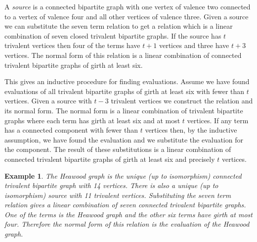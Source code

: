 \documentclass[12pt]{amsart}
\newtheorem{ex}[thm]{Example}
\newcommand{\Dfn}[1]{\emph{\color{blue}#1}}
\begin{document}
A \Dfn{source} is a connected bipartite graph with one vertex of valence two connected to a vertex of valence four and all other vertices of valence three.
Given a source we can substitute the seven term relation to get a relation which is a linear combination
of seven closed trivalent bipartite graphs. If the source has $t$ trivalent vertices then four of the terms have $t+1$ vertices and three have $t+3$ vertices. The normal form of this relation is a linear combination
of connected trivalent bipartite graphs of girth at least six.

This gives an inductive procedure for finding evaluations. Assume we have found evaluations of all
trivalent bipartite graphs of girth at least six with fewer than $t$ vertices. Given a source with $t-3$
trivalent vertices we construct the relation and its normal form. The normal form is a linear combination
of trivalent bipartite graphs where each term has girth at least six and at most $t$ vertices. If any term has a
connected component with fewer than $t$ vertices then, by the inductive assumption, we have found the
evaluation and we substitute the evaluation for the component. The result of these substitutions is
a linear combination of connected trivalent bipartite graphs of girth at least six and precisely $t$ vertices.

\begin{ex}
	The Heawood graph is the unique (up to isomorphism) connected trivalent bipartite graph with 14 vertices.
	There is also a unique (up to isomorphism) source with 11 trivalent vertices. Substituting the 
	seven term relation gives a linear combination of seven connected trivalent bipartite graphs. One of the terms is
	the Heawood graph and the other six terms have girth at most four. Therefore the normal form of this
	relation is the evaluation of the Heawood graph.
\end{ex}
\end{document}
